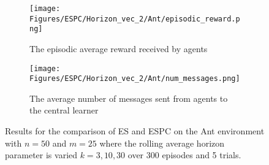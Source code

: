 \begin{figure}[H]
    \centering
    \begin{subfigure}{0.6\textwidth}
        \centering
        \texttt{[image: Figures/ESPC/Horizon\_vec\_2/Ant/episodic\_reward.png]}
        \caption{The episodic average reward received by agents}
        \label{fig:AntHorizonEpisodicReward}
    \end{subfigure}
    \begin{subfigure}{0.6\textwidth}
        \centering
        \texttt{[image: Figures/ESPC/Horizon\_vec\_2/Ant/num\_messages.png]}
        \caption{The average number of messages sent from agents to the central learner}
        \label{fig:AntHorizonMessages}
    \end{subfigure}
    \caption{Results for the comparison of ES and ESPC on the Ant environment with $n=50$ and $m=25$ where the rolling average horizon parameter is varied $k=3,10,30$ over 300 episodes and 5 trials.}
    \label{fig:AntHorizon}
\end{figure}


    





